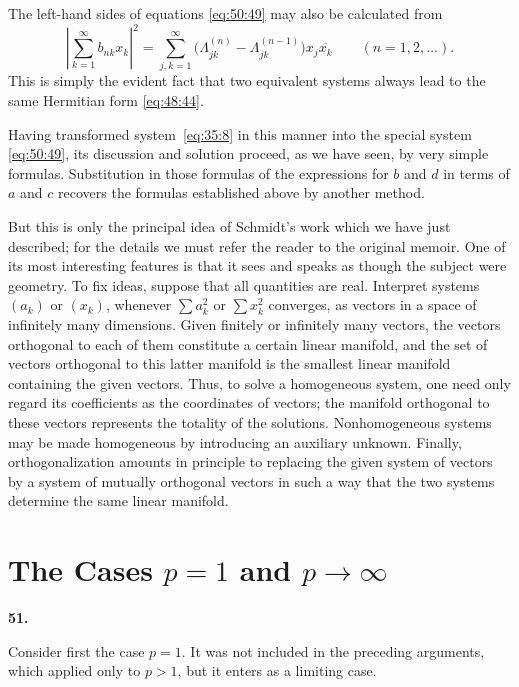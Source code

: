 \documentclass[
  paper=b5,
  fontsize=13pt,
  twoside=true,
  open=any,
  bookmarkpackage=false,
  chapterprefix=true,
  headings=normal
]{scrbook}
\theoremstyle{definition}
\newcommand{\numberedparagraph}[1]{%
  \par\medskip\phantomsection\label{sec:#1}%
  \noindent\textbf{#1.}\enspace
}
\begin{document}
The left-hand sides of equations \eqref{eq:50:49} may also be calculated
from
\[
  \left|\sum_{k=1}^{\infty}b_{nk}x_k\right|^2
  =\sum_{j,k=1}^{\infty}
   \bigl(\Lambda_{jk}^{(n)}-\Lambda_{jk}^{(n-1)}\bigr)x_j\overline{x_k}
  \qquad(n=1,2,\ldots).
\]
This is simply the evident fact that two equivalent systems always lead to
the same Hermitian form \eqref{eq:48:44}.

Having transformed system~\eqref{eq:35:8} in this manner into the special system
\eqref{eq:50:49}, its discussion and solution proceed, as we have seen, by
very simple formulas. Substitution in those formulas of the expressions for
$b$ and $d$ in terms of $a$ and $c$ recovers the formulas established above
by another method.

But this is only the principal idea of Schmidt's work
which we have just described; for the details we must refer the reader to
the original memoir. One of its most interesting features is that it sees
and speaks as though the subject were geometry. To fix ideas, suppose that
all quantities are real. Interpret systems $(a_k)$ or $(x_k)$, whenever
$\sum a_k^2$ or $\sum x_k^2$ converges, as vectors in a space of infinitely
many dimensions. Given finitely or infinitely many vectors, the vectors
orthogonal to each of them constitute a certain linear manifold, and the
set of vectors orthogonal to this latter manifold is the smallest linear
manifold containing the given vectors. Thus, to solve a homogeneous system,
one need only regard its coefficients as the coordinates of vectors; the
manifold orthogonal to these vectors represents the totality of the
solutions. Nonhomogeneous systems may be made homogeneous by introducing an
auxiliary unknown. Finally, orthogonalization amounts in principle to
replacing the given system of vectors by a system of mutually orthogonal
vectors in such a way that the two systems determine the same linear
manifold.

\section{The Cases \texorpdfstring{\(p=1\)}{p = 1} and
\texorpdfstring{\(p\to\infty\)}{p tending to infinity}}

\numberedparagraph{51}
Consider first the case $p=1$. It was not included in the preceding
arguments, which applied only to $p>1$, but it enters as a limiting case.
\end{document}
